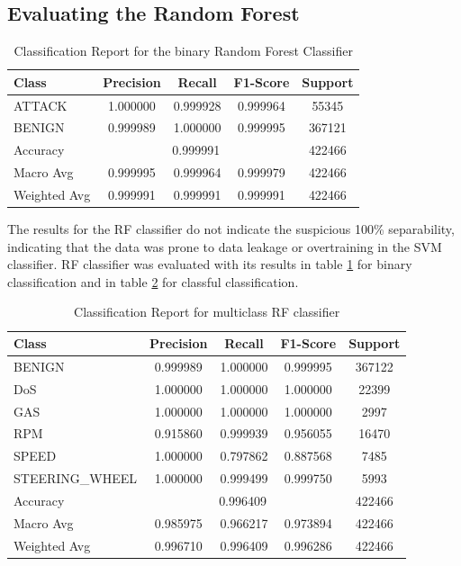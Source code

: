 \documentclass[conference]{IEEEtran}
\begin{document}
\subsection{Evaluating the Random Forest}
\begin{table}[h]
\centering
\caption{Classification Report for the binary Random Forest Classifier}
\begin{tabular}{lcccc}
\hline
\textbf{Class} & \textbf{Precision} & \textbf{Recall} & \textbf{F1-Score} & \textbf{Support} \\
\hline
ATTACK       & 1.000000 & 0.999928 & 0.999964 & 55345  \\
BENIGN       & 0.999989 & 1.000000 & 0.999995 & 367121 \\
\hline
Accuracy     & \multicolumn{3}{c}{0.999991} & 422466 \\
Macro Avg    & 0.999995 & 0.999964 & 0.999979 & 422466 \\
Weighted Avg & 0.999991 & 0.999991 & 0.999991 & 422466 \\
\hline
\end{tabular}
\label{tab:classification_report_binary_rf}
\end{table}
The results for the RF classifier do not indicate the suspicious 100\% separability, indicating that the data was prone to data leakage or overtraining in the SVM classifier.
RF classifier was evaluated with its results in table \ref{tab:classification_report_binary_rf} for binary classification and in table \ref{tab:classification_report_multiclass_RF} for classful classification.

\begin{table}[h]
\centering
\caption{Classification Report for multiclass RF classifier}
\begin{tabular}{lcccc}
\hline
\textbf{Class} & \textbf{Precision} & \textbf{Recall} & \textbf{F1-Score} & \textbf{Support} \\
\hline
BENIGN          & 0.999989 & 1.000000 & 0.999995 & 367122 \\
DoS             & 1.000000 & 1.000000 & 1.000000 & 22399 \\
GAS             & 1.000000 & 1.000000 & 1.000000 & 2997 \\
RPM             & 0.915860 & 0.999939 & 0.956055 & 16470 \\
SPEED           & 1.000000 & 0.797862 & 0.887568 & 7485 \\
STEERING\_WHEEL & 1.000000 & 0.999499 & 0.999750 & 5993 \\
\hline
Accuracy     & \multicolumn{3}{c}{0.996409} & 422466 \\
Macro Avg    & 0.985975 & 0.966217 & 0.973894 & 422466 \\
Weighted Avg & 0.996710 & 0.996409 & 0.996286 & 422466 \\
\hline
\end{tabular}
\label{tab:classification_report_multiclass_RF}
\end{table}
\end{document}
